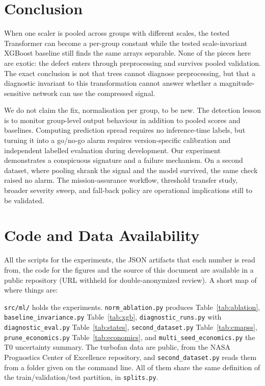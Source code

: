 \documentclass[preprint,12pt,authoryear,doubleblind]{elsarticle}
\begin{document}
\section{Conclusion}
\label{sec:conclusion}

When one scaler is pooled across groups with different scales, the tested Transformer can become a per-group constant while the tested scale-invariant XGBoost baseline still finds the same arrays separable. None of the pieces here are exotic: the defect enters through preprocessing and survives pooled validation. The exact conclusion is not that trees cannot diagnose preprocessing, but that a diagnostic invariant to this transformation cannot answer whether a magnitude-sensitive network can use the compressed signal.

We do not claim the fix, normalisation per group, to be new. The detection lesson is to monitor group-level output behaviour in addition to pooled scores and baselines. Computing prediction spread requires no inference-time labels, but turning it into a go/no-go alarm requires version-specific calibration and independent labelled evaluation during development. Our experiment demonstrates a conspicuous signature and a failure mechanism. On a second dataset, where pooling shrank the signal and the model survived, the same check raised no alarm. The mission-assurance workflow, threshold transfer study, broader severity sweep, and fall-back policy are operational implications still to be validated.

\section{Code and Data Availability}
\label{sec:code}

All the scripts for the experiments, the JSON artifacts that each number is read from, the code for the figures and the source of this document are available in a public repository (URL withheld for double-anonymized review). A short map of where things are:

\begin{sloppypar}
\texttt{src/ml/} holds the experiments. \texttt{norm\_ablation.py} produces Table~\ref{tab:ablation}, \texttt{baseline\_invariance.py} Table~\ref{tab:xgb}, \texttt{diagnostic\_runs.py} with \texttt{diagnostic\_eval.py} Table~\ref{tab:states}, \texttt{second\_dataset.py} Table~\ref{tab:cmapss}, \texttt{prune\_economics.py} Table~\ref{tab:economics}, and \texttt{multi\_seed\_economics.py} the T0 uncertainty summary. The turbofan data are public, from the NASA Prognostics Center of Excellence repository, and \texttt{second\_dataset.py} reads them from a folder given on the command line. All of them share the same definition of the train/validation/test partition, in \texttt{splits.py}.
\end{sloppypar}
\end{document}
